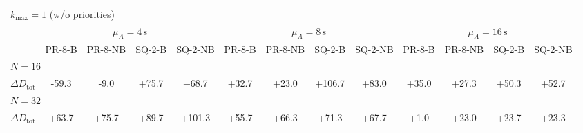 \begin{tabular}{l c c c c c c c c c c c c}
\toprule
\multicolumn{13}{l}{$k_{\max}=1$ (w/o priorities)} \\
\addlinespace[0.2em]
 & \multicolumn{4}{c}{$\mu_A=4\,\mathrm{s}$} & \multicolumn{4}{c}{$\mu_A=8\,\mathrm{s}$} & \multicolumn{4}{c}{$\mu_A=16\,\mathrm{s}$} \\
\cmidrule(lr){2-5}\cmidrule(lr){6-9}\cmidrule(lr){10-13}
 & PR-8-B & PR-8-NB & SQ-2-B & SQ-2-NB & PR-8-B & PR-8-NB & SQ-2-B & SQ-2-NB & PR-8-B & PR-8-NB & SQ-2-B & SQ-2-NB \\
\midrule
\multicolumn{13}{l}{${N=16}$} \\
\midrule
$\Delta D_{\mathrm{tot}}$ & -59.3 & -9.0 & +75.7 & +68.7 & +32.7 & +23.0 & +106.7 & +83.0 & +35.0 & +27.3 & +50.3 & +52.7 \\
\midrule
\multicolumn{13}{l}{${N=32}$} \\
\midrule
$\Delta D_{\mathrm{tot}}$ & +63.7 & +75.7 & +89.7 & +101.3 & +55.7 & +66.3 & +71.3 & +67.7 & +1.0 & +23.0 & +23.7 & +23.3 \\
\bottomrule
\end{tabular}

